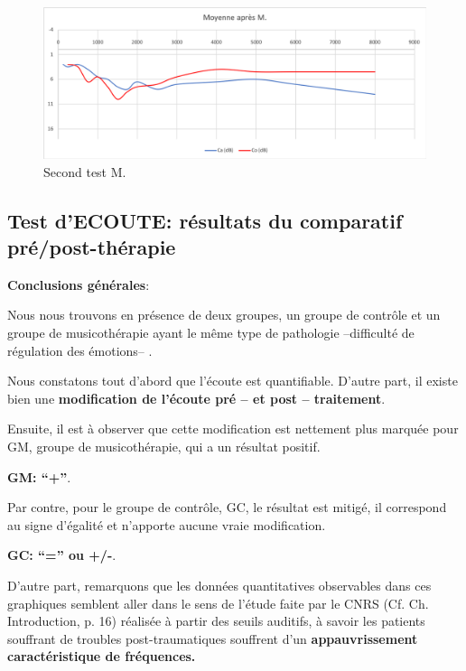                         \begin{figure}[th]
\centering
\includegraphics[width=0.7\linewidth]{images/graphiques/m_post.png}
\caption[Moyenne OG+OD]{Second test M.}

\end{figure}




\subsection{Test d'ECOUTE: résultats du comparatif pré/post-thérapie}

\textbf{Conclusions générales}:

             Nous nous trouvons
           en présence de deux groupes, un groupe de contrôle et un
           groupe de musicothérapie ayant le même type de
           pathologie --difficulté de régulation des émotions-- .


           Nous constatons tout d'abord que l'écoute est quantifiable.
           D'autre part, il existe bien
          une \textbf{modification de l'écoute pré -- et post -- traitement}.


          Ensuite, il est à observer que
          cette modification est nettement plus marquée
          pour GM, groupe de musicothérapie, qui a un résultat positif.


          \textbf{GM: ``+''}.


Par contre,  pour le groupe de contrôle, GC, le résultat est mitigé, il correspond au signe d'égalité et n'apporte aucune vraie modification.

          \textbf{GC:  ``='' ou +/-}.


        D'autre part, remarquons que les données quantitatives observables dans ces graphiques semblent aller dans le
sens de  l'étude faite par le
CNRS (Cf. Ch. Introduction, p. 16) \autocite{affectiveDisorders} réalisée à partir des seuils auditifs, à savoir
les patients souffrant de troubles post-traumatiques souffrent d'un
\textbf{appauvrissement caractéristique de fréquences.}


